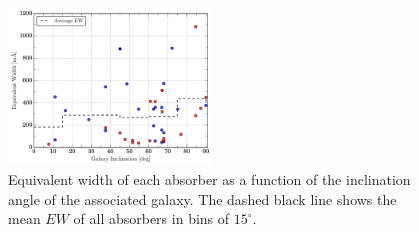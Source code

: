 \documentclass[iop]{emulateapj-rtx4}
\begin{document}


%


\begin{figure}[h!]
        \centering
        \includegraphics[width=0.48\textwidth]{W(inc)_medHistogram.pdf}
        \caption{\small{Equivalent width of each absorber as a function of the inclination angle of the associated galaxy. The dashed black line shows the mean $EW$ of all absorbers in bins of $15^{\circ}$.}}
        \label{ew_vs_inclination}
        \vspace{2pt}
\end{figure}
\end{document}
